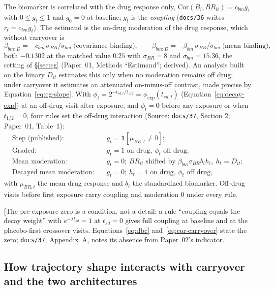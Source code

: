 \documentclass[11pt]{article}
\newcommand{\note}[1]{\textcolor{blue!60!black}{\small [#1]}}
\newcommand{\code}[1]{\texttt{#1}}
\begin{document}
The biomarker is correlated with the drug response only,
$\mathrm{Cor}(B_i, BR_{it}) = c_{bm} g_t$ with $0 \le g_t \le 1$ and
$g_0 = 0$ at baseline; $g_t$ is the \emph{coupling} (\code{docs/36}
writes $r_t = c_{bm} g_t$). The estimand is the on-drug moderation of
the drug response, which without carryover is
\begin{equation}
\beta_{bm:D} = -c_{bm}\,\sigma_{BR}/\sigma_{bm}
  \ \text{(covariance binding)}, \qquad
\beta_{bm:D} = -\beta_{bm}\,\sigma_{BR}/\sigma_{bm}
  \ \text{(mean binding)},
\label{eq:cg-estimand}
\end{equation}
both $-0.1302$ at the matched value $0.25$ with $\sigma_{BR} = 8$ and
$\sigma_{bm} = 15.36$, the setting of \S\ref{sec:cg} (Paper~01, Methods
``Estimand''; derived). An analysis built on the binary $D_{it}$ estimates this only
when no moderation remains off drug; under carryover it estimates an
attenuated on-minus-off contrast, made precise by
Equation~\eqref{eq:cg-slope}. With
$\phi_t = 2^{-t_{sd,t}/t_{1/2}} = \phi_{\exp}(t_{sd,t})$
(Equation~\eqref{eq:decay-exp}) at an off-drug visit after exposure,
and $\phi_t = 0$ before any exposure or when $t_{1/2} = 0$, four rules
set the off-drug interaction (Source: \code{docs/37}, Section 2;
Paper~01, Table~1):
\begin{align}
\text{Step (published):}\quad & g_t = \mathbf 1[\mu_{BR,t} \neq 0];
  \label{eq:cg-step} \\
\text{Graded:}\quad & g_t = 1 \text{ on drug}, \ \phi_t \text{ off drug};
  \label{eq:cg-graded} \\
\text{Mean moderation:}\quad & g_t = 0;\ BR_{it} \text{ shifted by }
  \beta_{bm}\sigma_{BR} b_i h_t,\ h_t = D_{it};
  \label{eq:cg-mm} \\
\text{Decayed mean moderation:}\quad & g_t = 0;\ h_t = 1 \text{ on
  drug}, \ \phi_t \text{ off drug},
  \label{eq:cg-dmm}
\end{align}
with $\mu_{BR,t}$ the mean drug response and $b_i$ the standardized
biomarker. Off-drug visits before first exposure carry coupling and
moderation $0$ under every rule.

\note{The pre-exposure zero is a condition, not a detail: a rule
``coupling equals the decay weight'' with $e^{-\lambda t_{sd}} = 1$ at
$t_{sd} = 0$ gives full coupling at baseline and at the placebo-first
crossover visits. Equations~\eqref{eq:dbc} and~\eqref{eq:cor-carryover}
state the zero; \code{docs/37}, Appendix~A, notes its absence from
Paper~02's indicator.}

\subsection{How trajectory shape interacts with carryover and the
two architectures}
\end{document}
